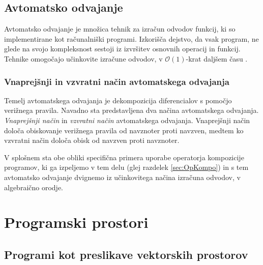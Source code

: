 \documentclass[a4paper, 12pt]{book}
\begin{document}
\section{Avtomatsko odvajanje}\label{sec:avtOdv}

Avtomatsko odvajanje je množica tehnik za izračun odvodov funkcij, ki so implementirane kot računalniški programi. Izkorišča dejstvo, da vsak program, ne glede na svojo kompleksnost sestoji iz izvršitev osnovnih operacij in funkcij. Tehnike omogočajo učinkovite izračune odvodov, v $\mathcal{O}(1)$-krat daljšem času \cite{AdSurvey}.

\subsection{Vnaprejšnji in vzvratni način avtomatskega odvajanja}

Temelj avtomatskega odvajanja je dekompozicija diferencialov s pomočjo verižnega pravila. Navadno sta predstavljena dva načina avtomatskega odvajanja. \emph{Vnaprejšnji način} \cite{PcAD} in \emph{vzvratni način} \cite{ReverseAD} avtomatskega odvajanja. Vnaprejšnji način določa obiskovanje verižnega pravila od navznoter proti navzven, medtem ko vzvratni način določa obisk od navzven proti navznoter.

V splošnem sta obe obliki specifična primera uporabe operatorja kompozicije programov, ki ga izpeljemo v tem delu (glej razdelek \ref{sec:OpKompo}) in s tem avtomatsko odvajanje dvignemo iz učinkovitega načina izračuna odvodov, v algebraično orodje.

\chapter{Programski prostori} \label{ch:programskiProstori}

\section{Programi kot preslikave vektorskih prostorov}\label{sec:progKotPres}
\end{document}
